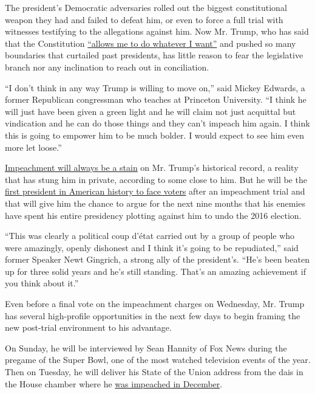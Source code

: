 The president's Democratic adversaries rolled out the biggest
constitutional weapon they had and failed to defeat him, or even to
force a full trial with witnesses testifying to the allegations against
him. Now Mr. Trump, who has said that the Constitution
\href{https://abcnews.go.com/Politics/exclusive-trump-cites-lessons-nixon-fire-mueller/story?id=63722267}{``allows
me to do whatever I want''} and pushed so many boundaries that curtailed
past
presidents\href{https://abcnews.go.com/Politics/exclusive-trump-cites-lessons-nixon-fire-mueller/story?id=63722267}{,}
has little reason to fear the legislative branch nor any inclination to
reach out in conciliation.

``I don't think in any way Trump is willing to move on,'' said Mickey
Edwards, a former Republican congressman who teaches at Princeton
University. ``I think he will just have been given a green light and he
will claim not just acquittal but vindication and he can do those things
and they can't impeach him again. I think this is going to empower him
to be much bolder. I would expect to see him even more let loose.''

\href{https://www.nytimes.com/2019/12/18/us/politics/trump-impeached.html}{Impeachment
will always be a stain} on Mr. Trump's historical record, a reality that
has stung him in private, according to some close to him. But he will be
the
\href{https://www.nytimes.com/2019/11/23/us/politics/trump-impeachment-voters.html}{first
president in American history to face voters} after an impeachment trial
and that will give him the chance to argue for the next nine months that
his enemies have spent his entire presidency plotting against him to
undo the 2016 election.

``This was clearly a political coup d'état carried out by a group of
people who were amazingly, openly dishonest and I think it's going to be
repudiated,'' said former Speaker Newt Gingrich, a strong ally of the
president's. ``He's been beaten up for three solid years and he's still
standing. That's an amazing achievement if you think about it.''

Even before a final vote on the impeachment charges on Wednesday, Mr.
Trump has several high-profile opportunities in the next few days to
begin framing the new post-trial environment to his advantage.

On Sunday, he will be interviewed by Sean Hannity of Fox News during the
pregame of the Super Bowl, one of the most watched television events of
the year. Then on Tuesday, he will deliver his State of the Union
address from the dais in the House chamber where he
\href{https://www.nytimes.com/2019/12/18/us/politics/trump-impeached.html}{was
impeached in December}.


